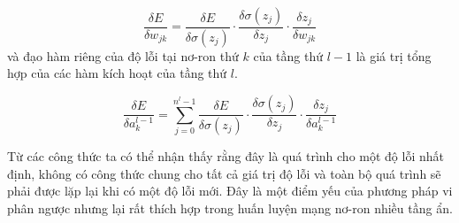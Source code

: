 \begin{equation}
	\label{eqn:chain5}
	\frac{\delta E}{\delta w_{jk}} = \frac{\delta E}{\delta \sigma(z_j)} \cdot\frac{\delta \sigma(z_j)}{\delta z_j}\cdot\frac{\delta z_j}{\delta w_{jk}}
\end{equation}
và đạo hàm riêng của độ lỗi tại nơ-ron thứ $k$ của tầng thứ $l - 1$ là giá trị tổng hợp của các hàm kích hoạt của tầng thứ $l$.

\begin{equation}
	\label{eqn:chain6}
	\frac{\delta E}{\delta a_k^{l-1}} = \sum_{j=0}^{n^{l}-1}\frac{\delta E}{\delta \sigma(z_j)}\cdot\frac{\delta \sigma(z_j)}{\delta z_j}\cdot\frac{\delta z_j}{\delta a_k^{l-1}}
\end{equation}

Từ các công thức ta có thể nhận thấy rằng đây là quá trình cho một độ lỗi nhất định, không có công thức chung cho tất cả giá trị độ lỗi và toàn bộ quá trình sẽ phải được lặp lại khi có một độ lỗi mới. Đây là một điểm yếu của phương pháp vi phân ngược nhưng lại rất thích hợp trong huấn luyện mạng nơ-ron nhiều tầng ẩn.